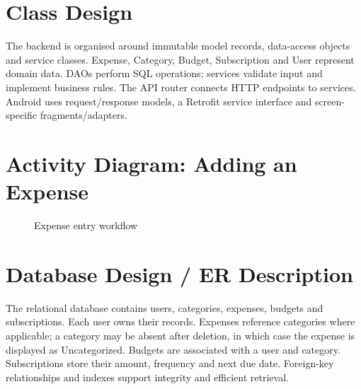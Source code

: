 \documentclass[12pt,a4paper]{report}
\begin{document}
\section{Class Design}
The backend is organised around immutable model records, data-access objects and service classes. Expense, Category, Budget, Subscription and User represent domain data. DAOs perform SQL operations; services validate input and implement business rules. The API router connects HTTP endpoints to services. Android uses request/response models, a Retrofit service interface and screen-specific fragments/adapters.

\section{Activity Diagram: Adding an Expense}
\begin{figure}[H]\centering
{}
\caption{Expense entry workflow}\label{fig:activity}
\end{figure}

\section{Database Design / ER Description}
The relational database contains users, categories, expenses, budgets and subscriptions. Each user owns their records. Expenses reference categories where applicable; a category may be absent after deletion, in which case the expense is displayed as Uncategorized. Budgets are associated with a user and category. Subscriptions store their amount, frequency and next due date. Foreign-key relationships and indexes support integrity and efficient retrieval.
\end{document}
